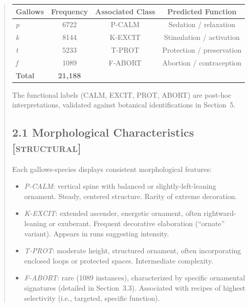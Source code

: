 \documentclass[11pt,a4paper]{article}
\begin{document}
\begin{abstract}
\begin{center}
\begin{tabular}{lccc}
\hline
\textbf{Gallows} & \textbf{Frequency} & \textbf{Associated Class} & \textbf{Predicted Function} \\
\hline
\textit{p} & 6722 & P-CALM & Sedation / relaxation \\
\textit{k} & 8144 & K-EXCIT & Stimulation / activation \\
\textit{t} & 5233 & T-PROT & Protection / preservation \\
\textit{f} & 1089 & F-ABORT & Abortion / contraception \\
\hline
\textbf{Total} & \textbf{21,188} & & \\
\hline
\end{tabular}
\end{center}

The functional labels (CALM, EXCIT, PROT, ABORT) are post-hoc interpretations, validated against botanical identifications in Section~5.

\subsection*{2.1 Morphological Characteristics \textsc{[structural]}}

Each gallows-species displays consistent morphological features:

\begin{itemize}
\item \textit{P-CALM}: vertical spine with balanced or slightly-left-leaning ornament. Steady, centered structure. Rarity of extreme decoration.

\item \textit{K-EXCIT}: extended ascender, energetic ornament, often rightward-leaning or exuberant. Frequent decorative elaboration (``ornate'' variant). Appears in runs suggesting intensity.

\item \textit{T-PROT}: moderate height, structured ornament, often incorporating enclosed loops or protected spaces. Intermediate complexity.

\item \textit{F-ABORT}: rare (1089 instances), characterized by specific ornamental signatures (detailed in Section~3.3). Associated with recipes of highest selectivity (i.e., targeted, specific function).

\end{itemize}


\end{abstract}
\end{document}
